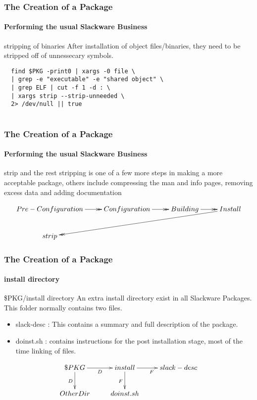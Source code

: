 \documentclass[12pt,hyperref={pdfpagelabels=true}]{beamer}
\begin{document}
\begin{frame}[fragile]
  \frametitle{The Creation of a Package}
  \framesubtitle{Performing the usual Slackware Business}
  \begin{block}{stripping of binaries}
    After installation of object files/binaries, they need to be stripped off of
    unnessecary symbols.
  \end{block}
  
  \pause

  \begin{lstlisting}
  find $PKG -print0 | xargs -0 file \
  | grep -e "executable" -e "shared object" \
  | grep ELF | cut -f 1 -d : \
  | xargs strip --strip-unneeded \
  2> /dev/null || true
  
  \end{lstlisting}
  
\end{frame}

\begin{frame}
  \frametitle{The Creation of a Package}
  \framesubtitle{Performing the usual Slackware Business}
  
  \begin{block}{strip and the rest}
    stripping is one of a few more steps in making a more acceptable package,
    others include compressing the man and info pages, removing excess data and
    adding documentation
  \end{block}

  \pause

  \begin{equation*}
    \xymatrix@C=2pc@R=2pc{
    Pre-Configuration\ar@{->>}[r] & Configuration\ar@{->>}[r] &
    Building\ar@{->>}[r] & Install\ar@{->>}[dlll]\\
    strip}
  \end{equation*}

\end{frame}

\begin{frame}[fragile]
  \frametitle{The Creation of a Package}
  \framesubtitle{install directory}
  \begin{block}{\$PKG/install directory}
    An extra install directory exist in all Slackware Packages.
    This folder normally contains two files.
    \begin{itemize}[<+-| alert@+>]
    \item slack-desc : This contains a summary and full description of the
      package.
    \item doinst.sh : contains instructions for the post installation stage,
      most of the time linking of files.
    \end{itemize}
  \end{block}

  \pause

  \begin{equation*}
    \xymatrix@C=2pc@R=2pc{
    \$PKG\/\ar[r]_D\ar[d]_D & install\ar[r]_F\ar[d]_F & slack-desc\\
    OtherDir  & doinst.sh  }
  \end{equation*}
\end{frame}
\end{document}
